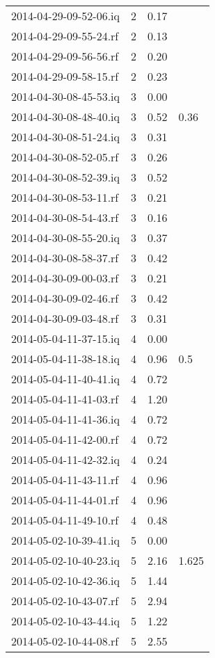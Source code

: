 \begin{center}
\begin{longtable}{@{}l p{1cm} p{3cm} p{3cm} @{}}
		2014-04-29-09-52-06.iq & 2 & 0.17 &  \\ 
		2014-04-29-09-55-24.rf & 2 & 0.13 &  \\ 
		2014-04-29-09-56-56.rf & 2 & 0.20 &  \\ 
		2014-04-29-09-58-15.rf & 2 & 0.23 &  \\ 
		2014-04-30-08-45-53.iq & 3 & 0.00 &  \\ 
		2014-04-30-08-48-40.iq & 3 & 0.52 & 0.36 \\ 
		2014-04-30-08-51-24.iq & 3 & 0.31 &  \\ 
		2014-04-30-08-52-05.rf & 3 & 0.26 &  \\ 
		2014-04-30-08-52-39.iq & 3 & 0.52 &  \\ 
		2014-04-30-08-53-11.rf & 3 & 0.21 &  \\ 
		2014-04-30-08-54-43.rf & 3 & 0.16 &  \\ 
		2014-04-30-08-55-20.iq & 3 & 0.37 &  \\ 
		2014-04-30-08-58-37.rf & 3 & 0.42 &  \\ 
		2014-04-30-09-00-03.rf & 3 & 0.21 &  \\ 
		2014-04-30-09-02-46.rf & 3 & 0.42 &  \\ 
		2014-04-30-09-03-48.rf & 3 & 0.31 &  \\ 
		2014-05-04-11-37-15.iq & 4 & 0.00 &  \\ 
		2014-05-04-11-38-18.iq & 4 & 0.96 & 0.5 \\ 
		2014-05-04-11-40-41.iq & 4 & 0.72 &  \\ 
		2014-05-04-11-41-03.rf & 4 & 1.20 &  \\ 
		2014-05-04-11-41-36.iq & 4 & 0.72 &  \\ 
		2014-05-04-11-42-00.rf & 4 & 0.72 &  \\ 
		2014-05-04-11-42-32.iq & 4 & 0.24 &  \\ 
		2014-05-04-11-43-11.rf & 4 & 0.96 &  \\ 
		2014-05-04-11-44-01.rf & 4 & 0.96 &  \\ 
		2014-05-04-11-49-10.rf & 4 & 0.48 &  \\ 
		2014-05-02-10-39-41.iq & 5 & 0.00 &  \\ 
		2014-05-02-10-40-23.iq & 5 & 2.16 & 1.625 \\ 
		2014-05-02-10-42-36.iq & 5 & 1.44 &  \\ 
		2014-05-02-10-43-07.rf & 5 & 2.94 &  \\ 
		2014-05-02-10-43-44.iq & 5 & 1.22 &  \\ 
		2014-05-02-10-44-08.rf & 5 & 2.55 &  \\ 

\end{longtable}
\end{center}
